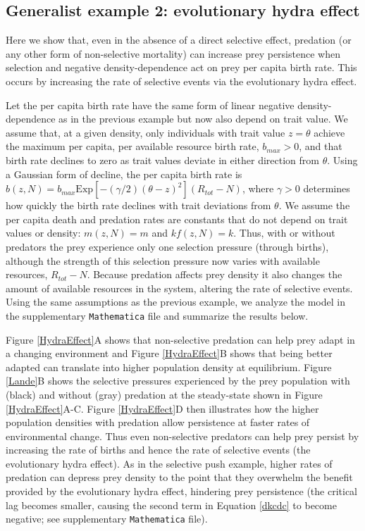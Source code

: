 \documentclass[11pt]{article}
\begin{document}
\subsection*{Generalist example 2: evolutionary hydra effect}

Here we show that, even in the absence of a direct selective effect, predation (or any other form of non-selective mortality) can increase prey persistence when selection and negative density-dependence act on prey per capita birth rate.
This occurs by increasing the rate of selective events via the evolutionary hydra effect.

Let the per capita birth rate have the same form of linear negative density-dependence as in the previous example but now also depend on trait value.
We assume that, at a given density, only individuals with trait value $z=\theta$ achieve the maximum per capita, per available resource birth rate, $b_{max}>0$, and that birth rate declines to zero as trait values deviate in either direction from $\theta$.
Using a Gaussian form of decline, the per capita birth rate is $b(z,N) = b_{max} \mathrm{Exp} \left[ -(\gamma/2) \left( \theta - z \right)^2 \right] \left( R_{tot} - N \right)$, where $\gamma>0$ determines how quickly the birth rate declines with trait deviations from $\theta$.
We assume the per capita death and predation rates are constants that do not depend on trait values or density: $m(z,N) = m$ and $k f(z,N) = k$.
Thus, with or without predators the prey experience only one selection pressure (through births), although the strength of this selection pressure now varies with available resources, $R_{tot} - N$.
Because predation affects prey density it also changes the amount of available resources in the system, altering the rate of selective events.
Using the same assumptions as the previous example, we analyze the model in the supplementary \texttt{Mathematica} file and summarize the results below.

Figure \ref{HydraEffect}A shows that non-selective predation can help prey adapt in a changing environment and Figure \ref{HydraEffect}B shows that being better adapted can translate into higher population density at equilibrium.
Figure \ref{Lande}B shows the selective pressures experienced by the prey population with (black) and without (gray) predation at the steady-state shown in Figure \ref{HydraEffect}A-C.
Figure \ref{HydraEffect}D then illustrates how the higher population densities with predation allow persistence at faster rates of environmental change.
Thus even non-selective predators can help prey persist by increasing the rate of births and hence the rate of selective events (the evolutionary hydra effect).
As in the selective push example, higher rates of predation can depress prey density to the point that they overwhelm the benefit provided by the evolutionary hydra effect, hindering prey persistence (the critical lag becomes smaller, causing the second term in Equation \ref{dkcdc} to become negative; see supplementary \texttt{Mathematica} file). 
\end{document}
